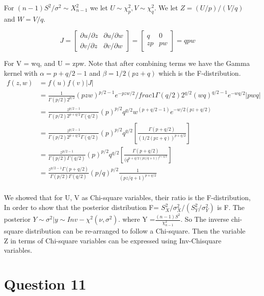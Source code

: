 \documentclass[
]{book}
\theoremstyle{definition}
\theoremstyle{definition}
\theoremstyle{definition}
\theoremstyle{definition}
\theoremstyle{remark}
\begin{document}
For \((n-1)S^2/\sigma^2 \sim X_{n-1}^2\) we let \(U \sim \chi_p^2, V\sim \chi_q^2\). We let \(Z = (U/p)/(V/q)\) and \(W=V/q\).

\[
J= 
\begin{bmatrix}
 \partial u/\partial z & \partial u/\partial w \\
 \partial v/\partial z & \partial v/\partial w  
\end{bmatrix} = 
\begin{bmatrix}
 q & 0 \\
  zp& pw  \\
\end{bmatrix} = qpw
\]

For V = wq, and U = zpw. Note that after combining terms we have the Gamma kernel with \(\alpha = p+q/2 -1\) and \(\beta= 1/2(pz+q)\) which is the F-distribution.\\
\[
\begin{aligned}
f(z,w)&= f(u)f(v)|J| \\
 &= \frac{1}{\Gamma(p/2)2^{p/2}}(pzw)^{p/2-1}e^{-pzw/2}/frac{1}{\Gamma(q/2)2^{q/2}}(wq)^{q/2-1}e^{-wq/2}|pwq| \\
 &=\frac{z^{p/2-1}}{\Gamma(p/2)2^{p+q/2}\Gamma(q/2)}(p)^{p/2}q^{q/2}w^{(p+q/2 -1)} e^{-w/2(pz+q/2)} \\
 & = \frac{z^{p/2-1}}{\Gamma(p/2)2^{p+q/2}\Gamma(q/2)}(p)^{p/2}q^{q/2}[\frac{\Gamma(p+q/2)}{(1/2(pz+q))^{p+q/2}}]\\
 &= \frac{z^{p/2-1}}{\Gamma(p/2)\Gamma(q/2)}(p)^{p/2}q^{q/2}[\frac{\Gamma(p+q/2)}{(q^{p+q/2(pz/q+1))^{p+q/2}}}]\\
 &=\frac{z^{p/2-1}\Gamma(p+q/2)}{\Gamma(p/2)\Gamma(q/2)}(p/q)^{p/2}\frac{1}{(pz/q+1)^{p+q/2}} \\
\end{aligned}
\]

We showed that for U, V as Chi-square variables, their ratio is the F-distribution, In order to show that the posterior distribution F= \(S_X^2/\sigma^2_X / (S_Y^2 / \sigma_Y^2)\) is F. The posterior \(Y \sim \sigma^2 | y \sim Inv-\chi^2(\nu, \sigma^2)\). where Y =\(\frac{(n-1)S^2}{\chi_{n-1}^2}\). So The inverse chi-square distribution can be re-arranged to follow a Chi-square. Then the variable Z in terms of Chi-square variables can be expressed using Inv-Chisquare variables.

\hypertarget{question-11-1}{%
\section*{Question 11}\label{question-11-1}}
\end{document}

